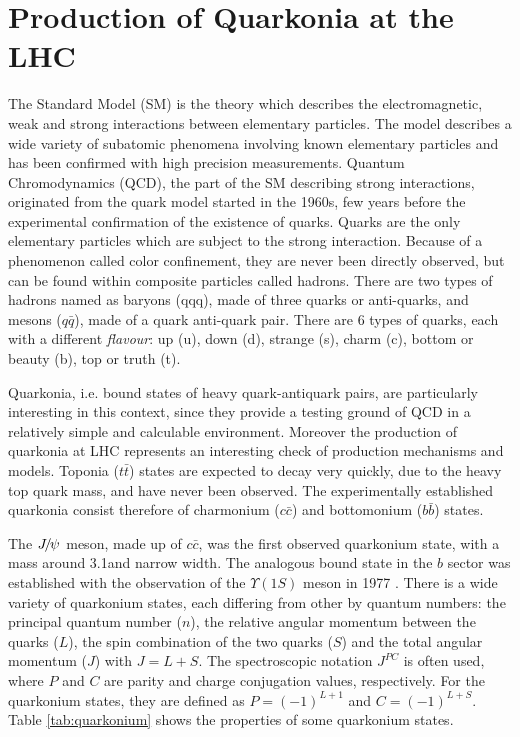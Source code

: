 \chapter{Production of Quarkonia at the LHC}
\label{sec:review}
The Standard Model (SM) is the theory which describes the electromagnetic, weak
and strong interactions between elementary particles. The model describes a
wide variety of subatomic phenomena involving known elementary particles and
has been confirmed with high precision measurements. Quantum Chromodynamics 
(QCD), the part of the SM describing strong interactions, originated from 
the quark model started in the 1960s\cite{GellMann:1964nj,Zweig:1981pd}, few
years before the experimental confirmation of the existence of quarks. Quarks are 
the only elementary particles which are subject to the strong interaction. 
Because of a phenomenon called color confinement, they are
never been directly observed,  but can be found within composite particles
called hadrons. There are two types of hadrons named as baryons (qqq), made of
three quarks or anti-quarks, and mesons ($q\bar{q}$), made of a quark 
anti-quark pair. There are 6 types of quarks, each with a different {\em{flavour}}: 
up (u), down (d), strange (s), charm (c), bottom or beauty (b), top or
truth (t).

Quarkonia, i.e. bound states of heavy quark-antiquark pairs, are particularly
interesting in this context, since they provide a testing ground of QCD in a
relatively simple and calculable environment. Moreover the production of
quarkonia at LHC represents an interesting check of production mechanisms and
models. Toponia ($t\bar{t}$) states are expected to decay very quickly, due to
the heavy top quark mass, and have never been observed. The experimentally
established quarkonia consist therefore of charmonium ($c\bar{c}$) and
bottomonium ($b\bar{b}$) states.

The ${{J\mskip -3mu/\mskip -2mu\psi\mskip 2mu}}$ meson, made up of $c\bar{c}$, was the first observed quarkonium
state\cite{PhysRevLett.33.1404}, with a mass around 3.1\gev and narrow width.
The analogous bound state in the $b$ sector was established with the
observation of the $\Upsilon(1S)$ meson in 1977 \cite{Herb:1977ek}. There is a
wide variety of quarkonium states, each differing from other by quantum
numbers: the principal quantum number ($n$), the relative angular momentum
between the quarks ($L$), the spin combination of the two quarks ($S$) and the
total angular momentum ($J$) with $J = L + S$. The spectroscopic notation
$J^{PC}$ is often used, where $P$ and $C$ are parity and
charge conjugation values, respectively. For the quarkonium states, they are
defined as $P=(-1)^{L+1}$ and $C=(-1)^{L+S}$. Table \ref{tab:quarkonium} shows
the properties of some quarkonium states.

